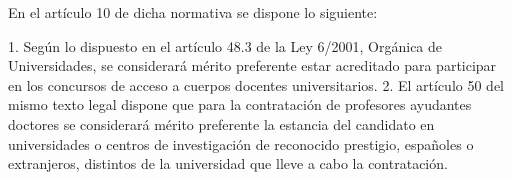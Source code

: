 \documentclass{article}
\begin{document}
\begin{itemize}
\begin{itemize}
\begin{scriptsize}
                  En el artículo 10 de dicha normativa se dispone lo siguiente:

                  1. Según lo dispuesto en el artículo 48.3 de la Ley 6/2001, Orgánica de Universidades, se considerará mérito preferente estar acreditado para participar en los concursos de acceso a cuerpos docentes universitarios.
                  2. El artículo 50 del mismo texto legal dispone que para la contratación de profesores ayudantes doctores se considerará mérito preferente la estancia del candidato en universidades o centros de investigación de reconocido prestigio, españoles o extranjeros, distintos de la universidad que lleve a cabo la contratación.
                \end{scriptsize}
        \end{itemize}


\end{itemize}
\end{document}

